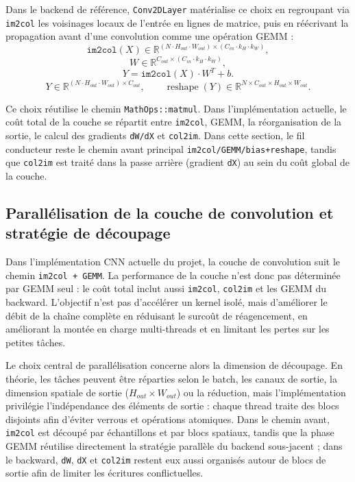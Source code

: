 \documentclass[a4paper,11pt,oneside]{article}
\begin{document}
Dans le backend de référence, \texttt{Conv2DLayer} matérialise ce choix en regroupant via \texttt{im2col} les voisinages locaux de l'entrée en lignes de matrice, puis en réécrivant la propagation avant d'une convolution comme une opération GEMM :
\[
\texttt{im2col}(X) \in \mathbb{R}^{(N \cdot H_{out} \cdot W_{out}) \times (C_{in}\cdot k_H \cdot k_W)},
\]
\[
W \in \mathbb{R}^{C_{out} \times (C_{in}\cdot k_H \cdot k_W)},
\]
\[
Y = \texttt{im2col}(X)\cdot W^T + b.
\]
\[
Y \in \mathbb{R}^{(N \cdot H_{out} \cdot W_{out}) \times C_{out}},
\qquad
\operatorname{reshape}(Y) \in \mathbb{R}^{N \times C_{out} \times H_{out} \times W_{out}}.
\]

Ce choix réutilise le chemin \texttt{MathOps::matmul}. Dans l'implémentation actuelle, le coût total de la couche se répartit entre \texttt{im2col}, GEMM, la réorganisation de la sortie, le calcul des gradients \texttt{dW/dX} et \texttt{col2im}. Dans cette section, le fil conducteur reste le chemin avant principal \texttt{im2col/GEMM/bias+reshape}, tandis que \texttt{col2im} est traité dans la passe arrière (gradient \texttt{dX}) au sein du coût global de la couche.

\subsection{Parallélisation de la couche de convolution et stratégie de découpage}

Dans l'implémentation CNN actuelle du projet, la couche de convolution suit le chemin \texttt{im2col + GEMM}. La performance de la couche n'est donc pas déterminée par GEMM seul : le coût total inclut aussi \texttt{im2col}, \texttt{col2im} et les GEMM du backward. L'objectif n'est pas d'accélérer un kernel isolé, mais d'améliorer le débit de la chaîne complète en réduisant le surcoût de réagencement, en améliorant la montée en charge multi-threads et en limitant les pertes sur les petites tâches.

Le choix central de parallélisation concerne alors la dimension de découpage. En théorie, les tâches peuvent être réparties selon le batch, les canaux de sortie, la dimension spatiale de sortie ($H_{out}\times W_{out}$) ou la réduction, mais l'implémentation privilégie l'indépendance des éléments de sortie : chaque thread traite des blocs disjoints afin d'éviter verrous et opérations atomiques. Dans le chemin avant, \texttt{im2col} est découpé par échantillons et par blocs spatiaux, tandis que la phase GEMM réutilise directement la stratégie parallèle du backend sous-jacent ; dans le backward, \texttt{dW}, \texttt{dX} et \texttt{col2im} restent eux aussi organisés autour de blocs de sortie afin de limiter les écritures conflictuelles.
\end{document}
